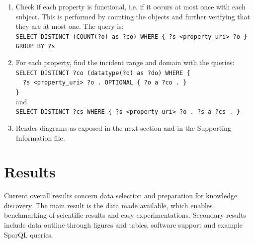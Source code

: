 \documentclass[review]{elsarticle}
\newcommand{\textttt}[1] {\texttt{\footnotesize#1}}
\newcommand{\h} {\hphantom ~ }
\begin{document}
\begin{enumerate}[leftmargin=0cm]
    \item Check if each property is functional, i.e. if it
        occurs at most once with each subject.
        This is performed by counting the objects and further verifying
        that they are at most one. The query is:\\
        \textttt{SELECT DISTINCT (COUNT(?o) as ?co) WHERE \{ ?s
            <property\_uri> ?o \} GROUP BY ?s}
    \item For each property, find the incident range and domain with the
        queries:\\
        \textttt{SELECT DISTINCT ?co (datatype(?o) as ?do) WHERE \{\\
			\h ?s <property\_uri> ?o . OPTIONAL \{ ?o a ?co . \}\\\}} \\
        and \\
        \textttt{SELECT DISTINCT ?cs WHERE \{ ?s <property\_uri> ?o . ?s a ?cs . \}}
\item Render diagrams as exposed in the next section and in the Supporting Information file.
\end{enumerate}
 
\section{Results}
\label{outline}
Current overall results concern data selection and preparation for knowledge discovery.
The main result is the data made available, which enables benchmarking of scientific results
and easy experimentations.
Secondary results include data outline through figures and tables,
software support and example SparQL queries.
\end{document}
